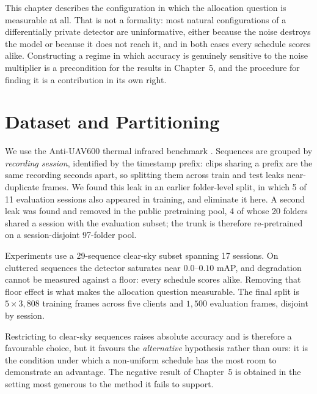 \label{sec:calibration}

This chapter describes the configuration in which the allocation question is
measurable at all. That is not a formality: most natural configurations of a
differentially private detector are uninformative, either because the noise
destroys the model or because it does not reach it, and in both cases every
schedule scores alike. Constructing a regime in which accuracy is genuinely
sensitive to the noise multiplier is a precondition for the results in
Chapter~5, and the procedure for finding it is a contribution in its own right.

\section{Dataset and Partitioning}

We use the Anti-UAV600 thermal infrared benchmark \cite{zhao20233rd}. Sequences
are grouped by \emph{recording session}, identified by the timestamp prefix:
clips sharing a prefix are the same recording seconds apart, so splitting them
across train and test leaks near-duplicate frames. We found this leak in an
earlier folder-level split, in which 5 of 11 evaluation sessions also appeared
in training, and eliminate it here. A second leak was found and removed in the
public pretraining pool, 4 of whose 20 folders shared a session with the
evaluation subset; the trunk is therefore re-pretrained on a session-disjoint
97-folder pool.

\vspace{10pt}

Experiments use a 29-sequence clear-sky subset spanning 17 sessions. On
cluttered sequences the detector saturates near $0.0$--$0.10$ mAP, and
degradation cannot be measured against a floor: every schedule scores alike.
Removing that floor effect is what makes the allocation question measurable. The
final split is $5\times3{,}808$ training frames across five clients and
$1{,}500$ evaluation frames, disjoint by session.

\vspace{10pt}

Restricting to clear-sky sequences raises absolute accuracy and is therefore a
favourable choice, but it favours the \emph{alternative} hypothesis rather than
ours: it is the condition under which a non-uniform schedule has the most room
to demonstrate an advantage. The negative result of Chapter~5 is obtained in the
setting most generous to the method it fails to support.

